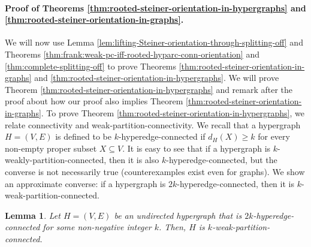\documentclass{article}
\newtheorem{lemma}{Lemma}[section]
\begin{document}
\paragraph{Proof of Theorems \ref{thm:rooted-steiner-orientation-in-hypergraphs} and \ref{thm:rooted-steiner-orientation-in-graphs}.}
We will now use Lemma \ref{lem:lifting-Steiner-orientation-through-splitting-off} and Theorems \ref{thm:frank:weak-pc-iff-rooted-hyparc-conn-orientation} and \ref{thm:complete-splitting-off} to prove Theorems \ref{thm:rooted-steiner-orientation-in-graphs} and \ref{thm:rooted-steiner-orientation-in-hypergraphs}. 
We will prove Theorem \ref{thm:rooted-steiner-orientation-in-hypergraphs} and remark after the proof about how our proof also implies Theorem \ref{thm:rooted-steiner-orientation-in-graphs}. 
To prove Theorem \ref{thm:rooted-steiner-orientation-in-hypergraphs}, we relate connectivity and weak-partition-connectivity. We recall that a hypergraph $H=(V, E)$ is defined to be $k$-hyperedge-connected if $d_H(X)\ge k$ for every non-empty proper subset $X\subseteq V$. 
It is easy to see that if a hypergraph is $k$-weakly-partition-connected, then it is also $k$-hyperedge-connected, but the converse is not necessarily true (counterexamples exist even for graphs). We show an approximate converse: if a hypergraph is $2k$-hyperedge-connected, then it is $k$-weak-partition-connected.
\begin{lemma}\label{lem:2k-conn-implies-k-weak-pc}
    Let $H = (V, E)$ be an undirected hypergraph that is $2k$-hyperedge-connected for some non-negative integer $k$. Then, $H$ is $k$-weak-partition-connected.
\end{lemma}
\end{document}
